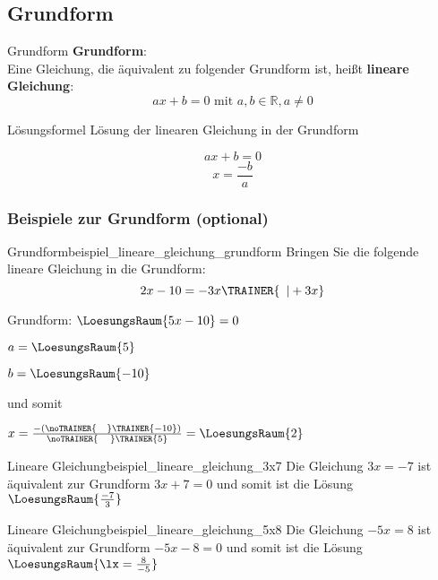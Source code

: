 
\subsection{Grundform}
\begin{definition}{Grundform}{}
  \textbf{Grundform}:\\

  Eine Gleichung, die äquivalent zu folgender Grundform ist, heißt
  \textbf{lineare Gleichung}:\\
  $$ax+b=0 \text{ mit } a,b\in\mathbb{R}, a\ne 0$$
  
  \end{definition}

\begin{gesetz}{Lösungsformel}{}
 Lösung der linearen Gleichung in der Grundform

 $$ax+b=0$$
  $$x = \frac{-b}a$$
  
\end{gesetz}

\newpage
\subsubsection{Beispiele zur Grundform (optional)}


\begin{beispiel}{Grundform}{beispiel_lineare_gleichung_grundform}
  Bringen Sie die folgende lineare Gleichung in die Grundform:
  $$2x-10 = -3x\TRAINER{\,\,\,| +3x}$$

  Grundform: $\LoesungsRaum{5x-10} = 0$

  $a = \LoesungsRaum{5}$

  $b = \LoesungsRaum{-10}$

  und somit

  \LARGE{$x=\frac{-(\noTRAINER{\,\,\,\,\,\,}\TRAINER{-10})}{\noTRAINER{\,\,\,\,\,\,\,}\TRAINER{5}}
    = \LoesungsRaum{2}$}

\end{beispiel}


\begin{beispiel}{Lineare Gleichung}{beispiel_lineare_gleichung_3x7}
  Die Gleichung $3x=-7$ ist äquivalent zur Grundform $3x+7=0$ und somit ist die Lösung $\LoesungsRaum{\frac{-7}{3}}$
  \end{beispiel}

\begin{beispiel}{Lineare Gleichung}{beispiel_lineare_gleichung_5x8}
  Die Gleichung $-5x=8$ ist äquivalent zur Grundform $-5x-8=0$ und somit ist die Lösung $\LoesungsRaum{\lx=\frac{8}{-5}}$
\end{beispiel}


\newpage
